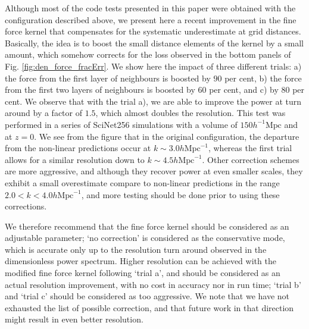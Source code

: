 \documentclass[useAMS,usenatbib]{mn2e}
\begin{document}
Although most of the code tests presented in this paper were obtained with the configuration described above, 
we present here a recent improvement in the fine force kernel that compensates for the systematic underestimate
at grid distances. Basically, the idea is to boost the small distance elements of the kernel by a small amount,
which somehow corrects for the loss observed in the bottom panels of Fig. \ref{fig:den_force_fracErr}.
We show here the impact of three different trials: a) the force from the first layer of neighbours is boosted by $90$ per cent, b)
the force from the first two layers of neighbours is boosted by $60$ per cent, and c) by $80$ per cent.
We observe that with the trial a), we are able to improve the power at turn around by a factor of $1.5$, which almost doubles the resolution.  
This test was performed in a series of SciNet256 simulations with a volume of $150 h^{-1} \mbox{Mpc}$ and at $z=0$.
We see from the figure that in the original configuration, the departure from the non-linear predictions occur at $k\sim 3.0 h\mbox{Mpc}^{-1}$,
whereas the first trial allows for a similar resolution down to $k\sim 4.5 h\mbox{Mpc}^{-1}$. 
Other correction schemes are more aggressive, and although they recover power at even smaller scales, 
they exhibit a small overestimate compare to non-linear predictions in the range $2.0 < k < 4.0 h\mbox{Mpc}^{-1}$, 
and more testing should be done prior to using these corrections. 

We therefore recommend that the fine force kernel should be considered as an adjustable parameter;
`no correction' is considered as the  conservative mode, which is accurate only up to the resolution turn around 
observed in the dimensionless power spectrum. Higher resolution can be achieved with the modified fine force kernel following `trial a',
and should be considered as an actual resolution improvement, with no cost in accuracy nor in run time;
`trial b' and `trial c' should be considered as too aggressive. We note that we have not exhausted the list of possible correction,
and that future work in that direction might result in even better resolution.
\end{document}
